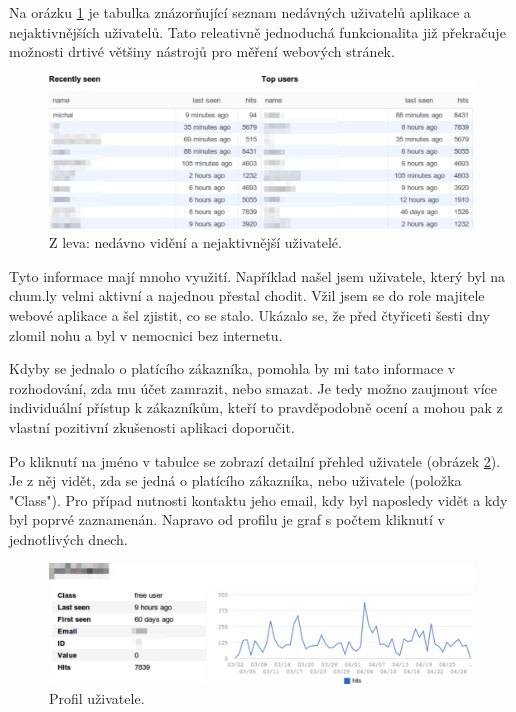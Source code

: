 \documentclass[bc,male,java,dept456]{diploma}						%
\begin{document}
Na orázku \ref{img:users_table} je tabulka znázorňující seznam nedávných uživatelů aplikace a nejaktivnějších uživatelů. Tato releativně jednoduchá funkcionalita již překračuje možnosti drtivé většiny nástrojů pro měření webových stránek. 


\begin{figure}[h]
	\centering
	\includegraphics[width=15cm]{img/users_table.pdf}
	\caption{Z leva: nedávno vidění a nejaktivnější uživatelé.}
	\label{img:users_table}
\end{figure}

Tyto informace mají mnoho využití. Například našel jsem uživatele, který byl na chum.ly velmi aktivní a najednou přestal chodit. Vžil jsem se do role majitele webové aplikace a šel zjistit, co se stalo. Ukázalo se, že před čtyřiceti šesti dny zlomil nohu a byl v nemocnici bez internetu. 

Kdyby se jednalo o platícího zákazníka, pomohla by mi tato informace v rozhodování, zda mu účet zamrazit, nebo smazat. Je tedy možno zaujmout více individuální přístup k zákazníkům, kteří to pravděpodobně ocení a mohou pak z vlastní pozitivní zkušenosti aplikaci doporučit.

Po kliknutí na jméno v tabulce se zobrazí detailní přehled uživatele (obrázek \ref{img:user_profile}). Je z něj vidět, zda se jedná o platícího zákazníka, nebo uživatele (položka "Class"). Pro případ nutnosti kontaktu jeho email, kdy byl naposledy vidět a kdy byl poprvé zaznamenán. Napravo od profilu je graf s počtem kliknutí v jednotlivých dnech.

\begin{figure}[h]
	\centering
	\includegraphics[width=15cm]{img/user_profile.pdf}
	\caption{Profil uživatele.}
	\label{img:user_profile}
\end{figure}
\end{document}
